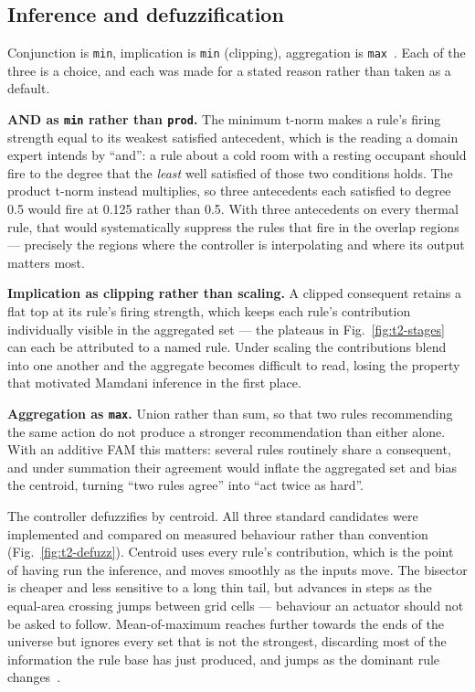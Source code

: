 \subsection{Inference and defuzzification}

Conjunction is \texttt{min}, implication is \texttt{min} (clipping), aggregation
is \texttt{max}~\cite{mamdani1975,lee1990}. Each of the three is a choice, and
each was made for a stated reason rather than taken as a default.

\textbf{AND as \texttt{min} rather than \texttt{prod}.} The minimum t-norm makes
a rule's firing strength equal to its weakest satisfied antecedent, which is the
reading a domain expert intends by ``and'': a rule about a cold room with a
resting occupant should fire to the degree that the \emph{least} well satisfied
of those two conditions holds. The product t-norm instead multiplies, so three
antecedents each satisfied to degree 0.5 would fire at 0.125 rather than 0.5.
With three antecedents on every thermal rule, that would systematically
suppress the rules that fire in the overlap regions --- precisely the regions
where the controller is interpolating and where its output matters most.

\textbf{Implication as clipping rather than scaling.} A clipped consequent
retains a flat top at its rule's firing strength, which keeps each rule's
contribution individually visible in the aggregated set --- the plateaus in
Fig.~\ref{fig:t2-stages} can each be attributed to a named rule. Under scaling
the contributions blend into one another and the aggregate becomes difficult to
read, losing the property that motivated Mamdani inference in the first place.

\textbf{Aggregation as \texttt{max}.} Union rather than sum, so that two rules
recommending the same action do not produce a stronger recommendation than
either alone. With an additive FAM this matters: several rules routinely share a
consequent, and under summation their agreement would inflate the aggregated set
and bias the centroid, turning ``two rules agree'' into ``act twice as hard''.

The controller defuzzifies by centroid. All three standard candidates were
implemented and compared on measured behaviour rather than convention
(Fig.~\ref{fig:t2-defuzz}). Centroid uses every rule's contribution, which is
the point of having run the inference, and moves smoothly as the inputs move.
The bisector is cheaper and less sensitive to a long thin tail, but advances in
steps as the equal-area crossing jumps between grid cells --- behaviour an
actuator should not be asked to follow. Mean-of-maximum reaches further towards
the ends of the universe but ignores every set that is not the strongest,
discarding most of the information the rule base has just produced, and jumps as
the dominant rule changes~\cite{leekwijck1999}.

